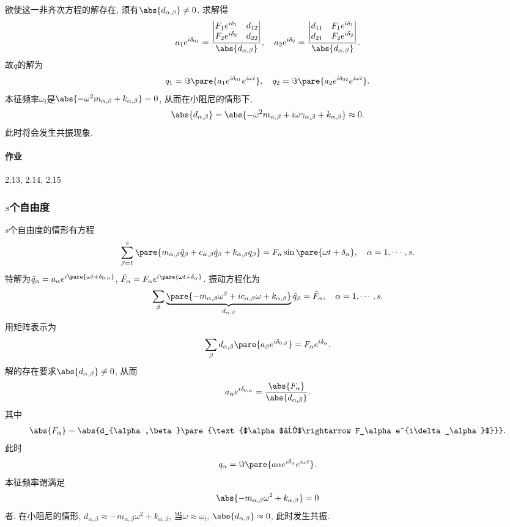 \documentclass[../LectureNotes.tex]{subfiles}
\begin{document}
欲使这一非齐次方程的解存在, 须有$\abs{d_{\alpha,\beta}} \neq 0$. 求解得
\[ a_1 e^{i\delta_{01}} = \frac{\begin{vmatrix}
        F_1 e^{i\delta_1} & d_{12} \\ F_2e^{i\delta_2} & d_{22}
    \end{vmatrix}}{\abs{d_{\alpha,\beta}}},\quad a_2e^{i\delta_2} = \frac{\begin{vmatrix}
        d_{11} & F_1e^{i\delta_1} \\ d_{21} & F_2e^{i\delta_2}
    \end{vmatrix}}{\abs{d_{\alpha,\beta}}}. \]
故$q$的解为
\[ q_1 = \Im\pare{a_1 e^{i\delta_{01}} e^{i\omega t}}, \quad q_2 = \Im\pare{a_2 e^{i\delta_{02}} e^{i\omega t}}. \]
本征频率$\omega_l$是$\abs{-\omega^2 m_{\alpha,\beta} + k_{\alpha,\beta}} = 0$, 从而在小阻尼的情形下,
\[ \abs{d_{\alpha,\beta}} = \abs{-\omega^2 m_{\alpha,\beta} + i\omega \gamma_{\alpha,\beta} + k_{\alpha,\beta}} \approx 0. \]
此时将会发生共振现象.


\paragraph{作业} %
\label{par:作业}

2.13, 2.14, 2.15



\subsubsection{\texorpdfstring{$s$}{s}个自由度} %
\label{ssub:s个自由度}

$s$个自由度的情形有方程
\[ \sum_{\beta =1}^s \pare{m_{\alpha,\beta} \ddot{q}_\beta + c_{\alpha,\beta}\dot{q}_\beta + k_{\alpha,\beta}q_\beta} = F_\alpha\sin\pare{\omega t + \delta_\alpha},\quad \alpha = 1,\cdots,s. \]
特解为$\tilde{q}_\alpha = a_\alpha e^{i\pare{\omega t + \delta_{0,\alpha}}}$, $\tilde{F}_\alpha = F_\alpha e^{i\pare{\omega t+\delta_\alpha}}$. 振动方程化为
\[ \sum_\beta \underbrace{\pare{-m_{\alpha,\beta}\omega^2 + ic_{\alpha,\beta}\omega + k_{\alpha,\beta}}}_{d_{\alpha,\beta}}\tilde{q}_\beta = \tilde{F}_\alpha,\quad \alpha = 1,\cdots, s. \]
用矩阵表示为
\[ \sum_\beta d_{\alpha,\beta}\pare{a_\beta e^{i\delta_{0,\beta}}} = F_\alpha e^{i\delta_\alpha}. \]
解的存在要求$\abs{d_{\alpha,\beta}}\neq 0$, 从而
\[ a_\alpha e^{i\delta_{0,\alpha}} = \frac{\abs{F_\alpha}}{\abs{d_{\alpha,\beta}}}. \]
其中
\[ \abs{F_\alpha} = \abs{d_{\alpha,\beta}\pare{\text{$\alpha$列$\rightarrow F_\alpha e^{i\delta_\alpha}$}}}. \]
此时
\[ q_\alpha = \Im\pare{a\alpha e^{i\delta_\alpha} e^{i\omega t}}. \]
本征频率谓满足
\[ \abs{-m_{\alpha,\beta}\omega^2 + k_{\alpha,\beta}} = 0 \]
者. 在小阻尼的情形, $d_{\alpha,\beta} \approx -m_{\alpha,\beta}\omega^2 + k_{\alpha,\beta}$, 当$\omega \approx \omega_l$, $\abs{d_{\alpha,\beta}}\approx 0$, 此时发生共振.
\end{document}
